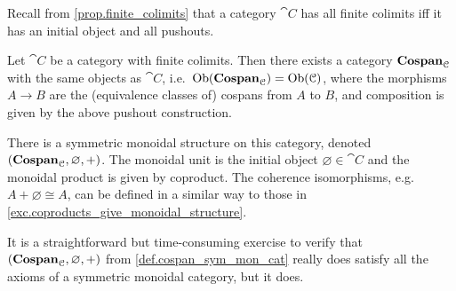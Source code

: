 \documentclass[7Sketches]{subfiles}
\begin{document}
Recall from \cref{prop.finite_colimits} that a category $\cat{C}$ has all finite colimits iff it has an initial object and all pushouts.

\begin{definition}%
\label{def.cospan_sym_mon_cat}
  Let $\cat{C}$ be a category with finite colimits. Then there exists a
  category $\mathbf{Cospan}_{\mathcal{C}}$ with the same objects as $\cat{C}$, i.e.\ $\operatorname{Ob}(\mathbf{Cospan}_{\mathcal{C}})=\operatorname{Ob}(\mathcal{C})$, where the morphisms $A \to B$ are the (equivalence classes of)
  cospans from $A$ to $B$, and composition is given by the above pushout construction.
  
  There is a symmetric monoidal structure on this category, denoted
  $(\mathbf{Cospan}_{\mathcal{C}},\varnothing,+)$. The monoidal unit is the initial object
  $\varnothing\in\cat{C}$ and the monoidal product is given by coproduct. The coherence
  isomorphisms, e.g.\ $A+\varnothing\cong A$, can be defined in a similar way to
  those in \cref{exc.coproducts_give_monoidal_structure}. 
\end{definition}

It is a straightforward but time-consuming exercise to verify that $(\mathbf{Cospan}_{\mathcal{C}},\varnothing,+)$ from \cref{def.cospan_sym_mon_cat} really does satisfy all the axioms of a symmetric
monoidal category, but it does.
\end{document}
